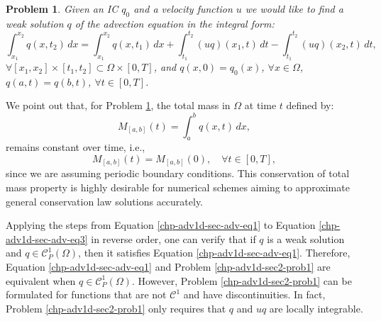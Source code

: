 \theoremstyle{plain}
\newtheorem{prob}{Problem}[chapter]
\begin{prob}
	\label{chp-adv1d-sec2-prob1}
	Given an IC ${q}_0$ and a velocity function $u$  we would like to find a weak solution ${q}$
	of the advection equation in the integral form:
	\begin{equation*}
	        \int_{x_1}^{x_2} {q}(x, t_2) \,dx =
       		\int_{x_1}^{x_2} {q}(x, t_1) \,dx +
        	\int_{t_1}^{t_2} {(uq)}(x_1, t) \,dt -
		\int_{t_1}^{t_2}{(uq)}(x_2, t) \,dt ,
	\end{equation*}
	$\forall [x_1, x_2]\times[t_1, t_2] \subset \Omega \times [0,T]$,
	and
	${q}(x,0) = {q}_0(x)$, $\forall x \in \Omega$, $q(a,t)=q(b,t)$, $\forall t \in [0,T]$.
\end{prob}
We point out that, for Problem \ref{chp-adv1d-sec2-prob1}, the total mass in $\Omega$ at time $t$ defined by:
\begin{equation*}
{M}_{[a,b]}(t) = \int_{a}^{b} q(x,t) \,dx,
\end{equation*}
remains constant over time, i.e.,
\begin{equation*}
	{M}_{[a,b]}(t) = {M}_{[a,b]}(0), \quad \forall t \in [0,T],
\end{equation*}
since we are assuming periodic boundary conditions.
This conservation of total mass property is highly desirable for numerical schemes aiming
to approximate general conservation law solutions accurately.

Applying the steps from Equation \eqref{chp-adv1d-sec-adv-eq1} to Equation \eqref{chp-adv1d-sec-adv-eq3} in reverse order,
one can verify that if ${q}$ is a weak solution and $q \in \mathcal{C}^1_P{(\Omega)}$, then it satisfies Equation \eqref{chp-adv1d-sec-adv-eq1}.
Therefore, Equation \eqref{chp-adv1d-sec-adv-eq1} and Problem \eqref{chp-adv1d-sec2-prob1} are equivalent when $q \in \mathcal{C}^1_P{(\Omega)}$.
However, Problem \eqref{chp-adv1d-sec2-prob1} can be formulated for functions that are not $\mathcal{C}^1$ and have discontinuities.
In fact, Problem \eqref{chp-adv1d-sec2-prob1} only requires that $q$ and $uq$ are locally integrable.

